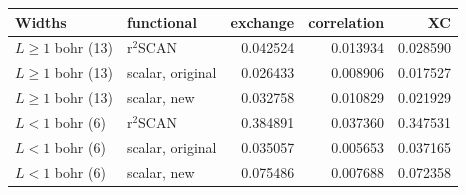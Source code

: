 \begin{tabular}{@{}ll rrr@{}}
\toprule
Widths & functional & exchange & correlation & XC \\
\midrule
$L\geq1$ bohr (13) & r$^2$SCAN & \textcolor{pyscfred}{0.042524} & \textcolor{pyscfred}{0.013934} & \textcolor{pyscfred}{0.028590} \\
$L\geq1$ bohr (13) & scalar, original & \textcolor{pyscfred}{0.026433} & \textcolor{pyscfred}{0.008906} & \textcolor{pyscfred}{0.017527} \\
$L\geq1$ bohr (13) & scalar, new & \textcolor{pyscfred}{0.032758} & \textcolor{pyscfred}{0.010829} & \textcolor{pyscfred}{0.021929} \\
\midrule
$L<1$ bohr (6) & r$^2$SCAN & \textcolor{pyscfred}{0.384891} & \textcolor{pyscfred}{0.037360} & \textcolor{pyscfred}{0.347531} \\
$L<1$ bohr (6) & scalar, original & \textcolor{pyscfred}{0.035057} & \textcolor{pyscfred}{0.005653} & \textcolor{pyscfred}{0.037165} \\
$L<1$ bohr (6) & scalar, new & \textcolor{pyscfred}{0.075486} & \textcolor{pyscfred}{0.007688} & \textcolor{pyscfred}{0.072358} \\
\bottomrule
\end{tabular}
